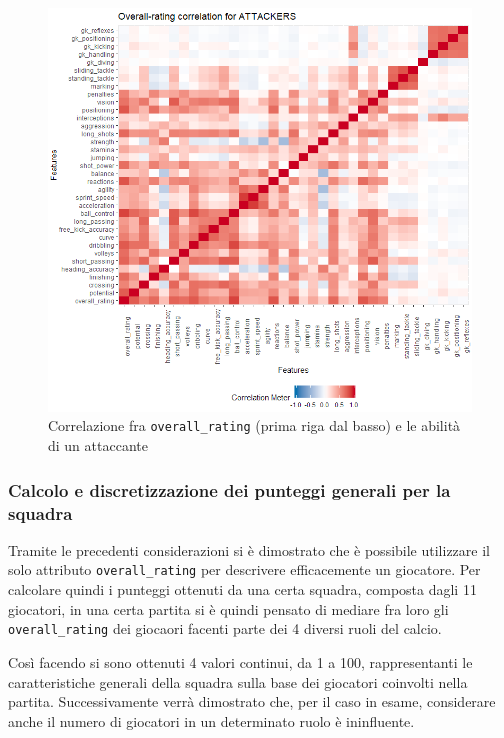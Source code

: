 \documentclass[hidelinks, 12pt]{article}
\begin{document}
\begin{figure}[H]
	\centering
	\includegraphics[scale=0.8]{images/04_05_atk_corr.png}
	\caption[Correlazione fra \texttt{overall\_rating} (prima riga dal basso) e le abilità di un attaccante]{Correlazione fra \texttt{overall\_rating} (prima riga dal basso) e le abilità di un attaccante}
	\label{img:dataset-atk-corr}
\end{figure}


\clearpage
\subsubsection{Calcolo e discretizzazione dei punteggi generali per la squadra}
\label{sec:dataset-discr}

Tramite le precedenti considerazioni si è dimostrato che è possibile utilizzare il solo attributo \texttt{overall\_rating} per descrivere efficacemente un giocatore. Per calcolare quindi i punteggi ottenuti da una certa squadra, composta dagli 11 giocatori, in una certa partita si è quindi pensato di mediare fra loro gli \texttt{overall\_rating} dei giocaori facenti parte dei 4 diversi ruoli del calcio.

Così facendo si sono ottenuti 4 valori continui, da 1 a 100, rappresentanti le caratteristiche generali della squadra sulla base dei giocatori coinvolti nella partita. Successivamente verrà dimostrato che, per il caso in esame, considerare anche il numero di giocatori in un determinato ruolo è ininfluente.
\end{document}
